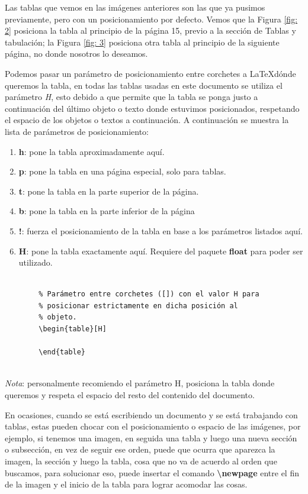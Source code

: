 Las tablas que vemos en las imágenes anteriores son las que ya pusimos previamente, pero con un posicionamiento por defecto. Vemos que la Figura \ref{fig: 2} posiciona la tabla al principio de la página 15, previo a la sección de Tablas y tabulación; la Figura \ref{fig: 3} posiciona otra tabla al principio de la siguiente página, no donde nosotros lo deseamos.

Podemos pasar un parámetro de posicionamiento entre corchetes a \LaTeX dónde queremos la tabla, en todas las tablas usadas en este documento se utiliza el parámetro \textit{H}, esto debido a que permite que la tabla se ponga justo a continuación del último objeto o texto donde estuvimos posicionados, respetando el espacio de los objetos o textos a continuación. A continuación se muestra la lista de parámetros de posicionamiento:
\begin{enumerate}
    \item \textbf{h}: pone la tabla aproximadamente aquí.
    \item \textbf{p}: pone la tabla en una página especial, solo para tablas.
    \item \textbf{t}: pone la tabla en la parte superior de la página.
    \item \textbf{b}: pone la tabla en la parte inferior de la página
    \item \textbf{!}: fuerza el posicionamiento de la tabla en base a los parámetros listados aquí.
    \item \textbf{H}: pone la tabla exactamente aquí. Requiere del paquete \textbf{float} para poder ser utilizado.
\end{enumerate}
\begin{lstlisting}
    
        % Parámetro entre corchetes ([]) con el valor H para
        % posicionar estrictamente en dicha posición al
        % objeto.
        \begin{table}[H]
        
        \end{table}
    
\end{lstlisting}

\textit{Nota}: personalmente recomiendo el parámetro H, posiciona la tabla donde queremos y respeta el espacio del resto del contenido del documento.

En ocasiones, cuando se está escribiendo un documento y se está trabajando con tablas, estas pueden chocar con el posicionamiento o espacio de las imágenes, por ejemplo, si tenemos una imagen, en seguida una tabla y luego una nueva sección o subsección, en vez de seguir ese orden, puede que ocurra que aparezca la imagen, la sección y luego la tabla, cosa que no va de acuerdo al orden que buscamos, para solucionar eso, puede insertar el comando \textbf{\textbackslash{newpage}} entre el fin de la imagen y el inicio de la tabla para lograr acomodar las cosas.

